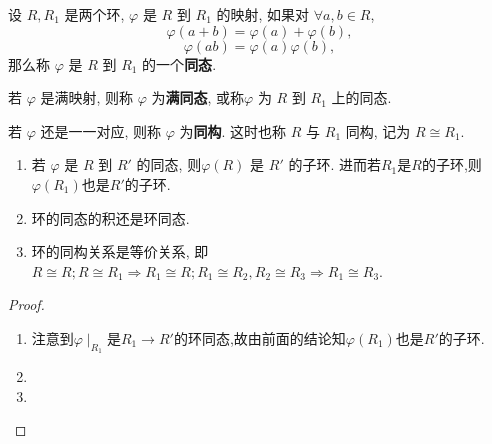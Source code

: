 \documentclass[../../main.tex]{subfiles}%
\begin{document}
\begin{definition}
设 \( R, R_1 \) 是两个环, \( \varphi \) 是 \( R \) 到 \( R_1 \) 的映射, 如果对 \( \forall a,b \in R \),
\[
\varphi(a + b) = \varphi(a) + \varphi(b),
\]
\[
\varphi(ab) = \varphi(a)\varphi(b),
\]
那么称 \( \varphi \) 是 \( R \) 到 \( R_1 \) 的一个\textbf{同态}.

若 \( \varphi \) 是满映射, 则称 \( \varphi \) 为\textbf{满同态}, 或称\( \varphi \) 为 \( R \) 到 \( R_1 \) 上的同态.

若 \( \varphi \) 还是一一对应, 则称 \( \varphi \) 为\textbf{同构}. 这时也称 \( R \) 与 \( R_1 \) 同构, 记为 \( R \cong R_1 \).
\end{definition}

\begin{proposition}\label{proposition:环同态的基本性质}
\begin{enumerate}[(1)]
\item\label{proposition:环同态的基本性质-1} 若 \( \varphi \) 是 \( R \) 到 \( R' \) 的同态, 则\( \varphi(R) \) 是 \( R' \) 的子环. 进而若$R_1$是$R$的子环,则$\varphi(R_1)$也是$R'$的子环.

\item\label{proposition:环同态的基本性质-2} 环的同态的积还是环同态. 

\item 环的同构关系是等价关系, 即 \( R \cong R; R \cong R_1 \Rightarrow R_1 \cong R; R_1 \cong R_2, R_2 \cong R_3 \Rightarrow R_1 \cong R_3 \).
\end{enumerate}
\end{proposition}
\begin{proof}
\begin{enumerate}[(1)]
\item 注意到$\varphi\mid_{R_1}$是$R_1\to R'$的环同态,故由前面的结论知$\varphi(R_1)$也是$R'$的子环.

\item 

\item 
\end{enumerate}

\end{proof}
\end{document}
